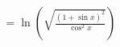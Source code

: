 \documentclass[preview]{standalone}
\begin{document}
\begin{align*}
=\ln \left( \sqrt{\frac{(1 + \sin{x})^2}{\cos^2{x}}} \right)
\end{align*}
\end{document}
